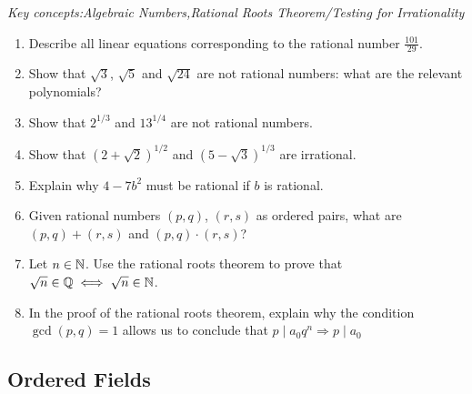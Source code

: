 \begin{exercises}{}
	\emph{Key concepts:\quad Algebraic Numbers,\quad Rational Roots Theorem/Testing for Irrationality}%


	
	\begin{enumerate}%
	  \item Describe all linear equations corresponding to the rational number $\frac{101}{29}$.
	  
	  \item %
	  Show that $\sqrt 3$, $\sqrt 5$ and $\sqrt{24}$ are not rational numbers: what are the relevant polynomials?
	  
	  
	  \item %
	  Show that $2^{1/3}$ and $13^{1/4}$ are not rational numbers.
	
	
	  \item%
	  Show that $(2+\sqrt 2)^{1/2}$ and $(5-\sqrt 3)^{1/3}$ are irrational.
	  
	  
	  
	  
	  
	  
	  \item%
	  Explain why $4-7b^2$ must be rational if $b$ is rational.
	  
	  
	  \item\label{exs:ratnumber+x} Given rational numbers $(p,q)$, $(r,s)$ as ordered pairs, what are $(p,q)+(r,s)$ and $(p,q)\cdot(r,s)$?
	  
	  
	  \item Let $n\in\mathbb{N}$. Use the rational roots theorem to prove that $\sqrt n\in\mathbb{Q}\iff \sqrt n\in\mathbb{N}$.
	  
	  
	  \item In the proof of the rational roots theorem, explain why the condition $\gcd(p,q)=1$ allows us to conclude that $p\mid a_0q^n\Longrightarrow p\mid a_0$
	\end{enumerate}
\end{exercises}


\clearpage



\subsection{Ordered Fields}

